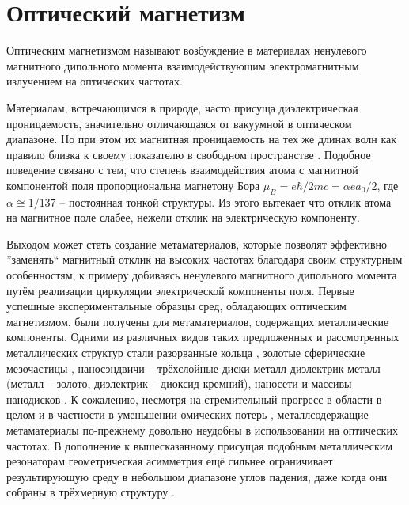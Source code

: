 \section{Оптический магнетизм}

Оптическим магнетизмом называют возбуждение в материалах ненулевого магнитного дипольного момента взаимодействующим электромагнитным излучением на оптических частотах.

Материалам, встречающимся в природе, часто присуща диэлектрическая проницаемость, значительно отличающаяся от вакуумной в оптическом диапазоне. Но при этом их магнитная проницаемость на тех же длинах волн как правило близка к своему показателю в свободном пространстве \cite{Shalaev2007}. Подобное поведение связано с тем, что степень взаимодействия атома с магнитной компонентой поля пропорциональна магнетону Бора $\mu_B = e \hbar/2 mc = \alpha e a_0 /2$, где $\alpha \cong 1/137$ -- постоянная тонкой структуры. Из этого вытекает что отклик атома на магнитное поле слабее, нежели отклик на электрическую компоненту.

Выходом может стать создание метаматериалов, которые позволят эффективно ''заменять`` магнитный отклик на высоких частотах благодаря своим структурным особенностям, к примеру добиваясь ненулевого магнитного дипольного момента путём реализации циркуляции электрической компоненты поля. Первые успешные экспериментальные образцы сред, обладающих оптическим магнетизмом, были получены для метаматериалов, содержащих металлические компоненты. Одними из различных видов таких предложенных и рассмотренных металлических структур стали разорванные кольца \cite{Enkrich2005, Klein2006}, золотые сферические мезочастицы \cite{Evlyukhin2012}, наносэндвичи \cite{Pakizeh2006} -- трёхслойные диски металл-диэлектрик-металл (металл -- золото, диэлектрик -- диоксид кремний), наносети \cite{Reinhold2012} и массивы нанодисков \cite{Gantzounis2008}. К сожалению, несмотря на стремительный прогресс в области в целом и в частности в уменьшении омических потерь \cite{Xiao2010}, металлсодержащие метаматериалы по-прежнему довольно неудобны в использовании на оптических частотах. В дополнение к вышесказанному присущая подобным металлическим резонаторам геометрическая асимметрия ещё сильнее ограничивает результирующую среду в небольшом диапазоне углов падения, даже когда они собраны в трёхмерную структуру \cite{Burckel2010}.

